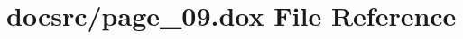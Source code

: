 \hypertarget{page__09_8dox}{\section{docsrc/page\-\_\-09.dox File Reference}
\label{page__09_8dox}
}
